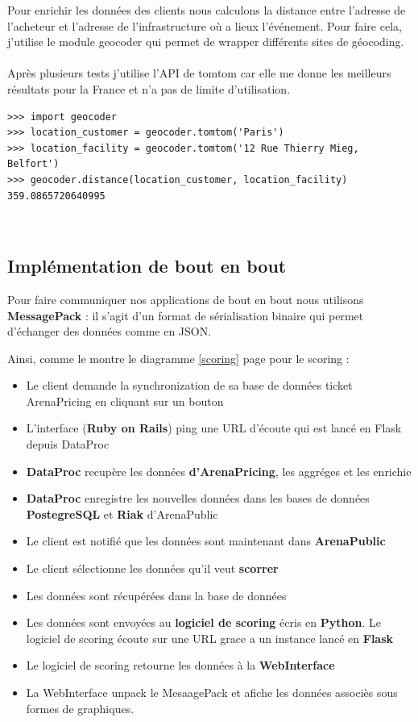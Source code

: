 Pour enrichir les données des clients nous calculons la distance entre l'adresse de l'acheteur et l'adresse de l'infrastructure où a lieux l'événement.
Pour faire cela, j'utilise le module geocoder qui permet de wrapper différents sites de géocoding.
\\ \\
Après plusieurs tests j'utilise l'API de tomtom car elle me donne les meilleurs résultats pour la France et n'a pas de limite d'utilisation.

\lstset{style=custompython}
\begin{lstlisting}
>>> import geocoder
>>> location_customer = geocoder.tomtom('Paris')
>>> location_facility = geocoder.tomtom('12 Rue Thierry Mieg, Belfort')
>>> geocoder.distance(location_customer, location_facility)
359.0865720640995
\end{lstlisting}
\leavevmode \\

\subsection{Implémentation de bout en bout}
Pour faire communiquer nos applications de bout en bout nous utilisons \textbf{MessagePack} : il s'agit d'un format de sérialisation binaire qui permet d'échanger des données comme en JSON.

Ainsi, comme le montre le diagramme \ref{scoring} page \pageref{scoring} pour le scoring : 

\begin{itemize}
  \item[\textbullet] Le client demande la synchronization de sa base de données ticket ArenaPricing en cliquant sur un bouton
  \item[\textbullet] L'interface (\textbf{Ruby on Rails}) ping une URL d'écoute qui est lancé en Flask depuis DataProc
  \item[\textbullet] \textbf{DataProc} recupère les données \textbf{d'ArenaPricing}, les aggréges et les enrichie
  \item[\textbullet] \textbf{DataProc} enregistre les nouvelles données dans les bases de données \textbf{PostegreSQL} et \textbf{Riak} d'ArenaPublic
  \item[\textbullet] Le client est notifié que les données sont maintenant dans \textbf{ArenaPublic}
  \item[\textbullet] Le client sélectionne les données qu'il veut \textbf{scorrer}
  \item[\textbullet] Les données sont récupérées dans la base de données
  \item[\textbullet] Les données sont envoyées au \textbf{logiciel de scoring} écris en \textbf{Python}. Le logiciel de scoring écoute sur une URL grace a un instance lancé en \textbf{Flask}
  \item[\textbullet] Le logiciel de scoring retourne les données à la \textbf{WebInterface}
  \item[\textbullet] La WebInterface unpack le MesaagePack et afiche les données associès sous formes de graphiques. 
 

\end{itemize} 

